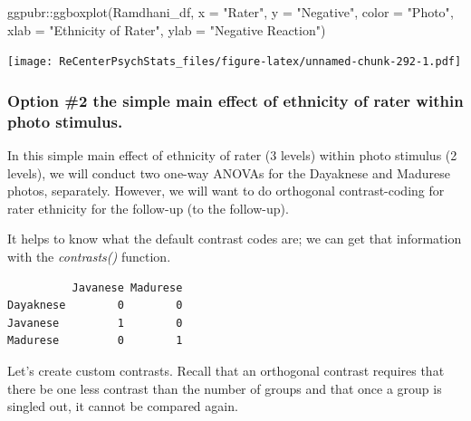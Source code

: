 \documentclass[
  11pt,
]{book}
\newenvironment{Shaded}{\begin{snugshade}}{\end{snugshade}}
\newcommand{\AttributeTok}[1]{\textcolor[rgb]{0.77,0.63,0.00}{#1}}
\newcommand{\FunctionTok}[1]{\textcolor[rgb]{0.00,0.00,0.00}{#1}}
\newcommand{\NormalTok}[1]{#1}
\newcommand{\SpecialCharTok}[1]{\textcolor[rgb]{0.00,0.00,0.00}{#1}}
\newcommand{\StringTok}[1]{\textcolor[rgb]{0.31,0.60,0.02}{#1}}
\begin{document}
\begin{Shaded}
\begin{Highlighting}[]
\NormalTok{ggpubr}\SpecialCharTok{::}\FunctionTok{ggboxplot}\NormalTok{(Ramdhani\_df, }\AttributeTok{x =} \StringTok{"Rater"}\NormalTok{, }\AttributeTok{y =} \StringTok{"Negative"}\NormalTok{, }\AttributeTok{color =} \StringTok{"Photo"}\NormalTok{,}
    \AttributeTok{xlab =} \StringTok{"Ethnicity of Rater"}\NormalTok{, }\AttributeTok{ylab =} \StringTok{"Negative Reaction"}\NormalTok{)}
\end{Highlighting}
\end{Shaded}

\texttt{[image: ReCenterPsychStats\_files/figure-latex/unnamed-chunk-292-1.pdf]}

\hypertarget{option-2-the-simple-main-effect-of-ethnicity-of-rater-within-photo-stimulus.}{%
\subsubsection{Option \#2 the simple main effect of ethnicity of rater within photo stimulus.}\label{option-2-the-simple-main-effect-of-ethnicity-of-rater-within-photo-stimulus.}}

In this simple main effect of ethnicity of rater (3 levels) within photo stimulus (2 levels), we will conduct two one-way ANOVAs for the Dayaknese and Madurese photos, separately. However, we will want to do orthogonal contrast-coding for rater ethnicity for the follow-up (to the follow-up).

It helps to know what the default contrast codes are; we can get that information with the \emph{contrasts()} function.

\begin{Shaded}
\end{Shaded}

\begin{verbatim}
          Javanese Madurese
Dayaknese        0        0
Javanese         1        0
Madurese         0        1
\end{verbatim}

Let's create custom contrasts. Recall that an orthogonal contrast requires that there be one less contrast than the number of groups and that once a group is singled out, it cannot be compared again.
\end{document}
